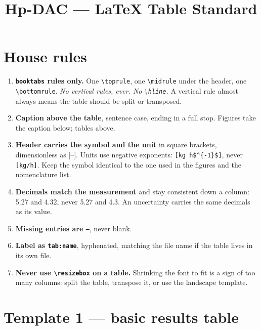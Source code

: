 \documentclass[11pt,a4paper]{article}
\title{Hp-DAC --- LaTeX Table Standard}
\date{}
\begin{document}
\maketitle

\section*{House rules}

\begin{enumerate}
  \item \textbf{\texttt{booktabs} rules only.} One \verb|\toprule|, one
        \verb|\midrule| under the header, one \verb|\bottomrule|.
        \emph{No vertical rules, ever. No \texttt{\textbackslash hline}.}
        A vertical rule almost always means the table should be split or
        transposed.
  \item \textbf{Caption above the table}, sentence case, ending in a full
        stop. Figures take the caption below; tables above.
  \item \textbf{Header carries the symbol and the unit} in square brackets,
        dimensionless as [--]. Units use negative exponents:
        \verb|[kg h$^{-1}$]|, never \verb|[kg/h]|. Keep the symbol identical
        to the one used in the figures and the nomenclature list.
  \item \textbf{Decimals match the measurement} and stay consistent down a
        column: \num{5.27} and \num{4.32}, never \num{5.27} and 4.3.
        An uncertainty carries the same decimals as its value.
  \item \textbf{Missing entries are \texttt{--}}, never blank.
  \item \textbf{Label as \texttt{tab:name}}, hyphenated, matching the file
        name if the table lives in its own file.
  \item \textbf{Never use \texttt{\textbackslash resizebox} on a table.}
        Shrinking the font to fit is a sign of too many columns: split the
        table, transpose it, or use the landscape template.
\end{enumerate}

\clearpage
\section*{Template 1 --- basic results table}
\end{document}
